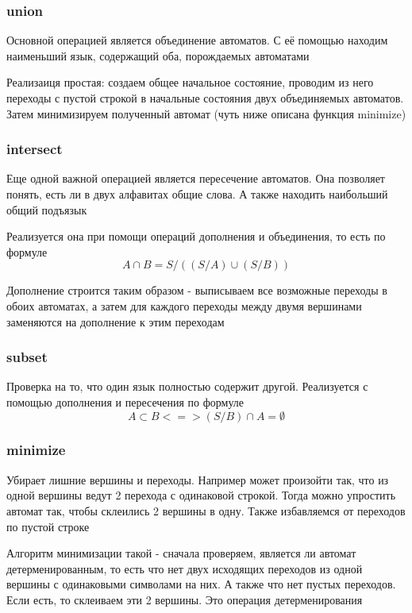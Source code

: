 \subsubsection*{union}
Основной операцией является объединение автоматов. С её помощью находим наименьший язык, содержащий оба, порождаемых автоматами

Реализаиця простая: создаем общее начальное состояние, проводим из него переходы с пустой строкой в начальные состояния двух объединяемых автоматов. Затем минимизируем полученный автомат (чуть ниже описана функция minimize)

\subsubsection*{intersect}
Еще одной важной операцией является пересечение автоматов. Она позволяет понять, есть ли в двух алфавитах общие слова. А также находить наибольший общий подъязык

Реализуется она при помощи операций дополнения и объединения, то есть по формуле \[A \cap B = S / ((S / A) \cup (S / B))\]

Дополнение строится таким образом - выписываем все возможные переходы в обоих автоматах, а затем для каждого переходы между двумя вершинами заменяются на дополнение к этим переходам

\subsubsection*{subset}
Проверка на то, что один язык полностью содержит другой. Реализуется с помощью дополнения и пересечения по формуле
\[A \subset B <=> (S / B) \cap A = \emptyset\]

\subsubsection*{minimize}
Убирает лишние вершины и переходы. Например может произойти так, что из одной вершины ведут 2 перехода с одинаковой строкой. Тогда можно упростить автомат так, чтобы склеились 2 вершины в одну. Также избавляемся от переходов по пустой строке

Алгоритм минимизации такой - сначала проверяем, является ли автомат детерменированным, то есть что нет двух исходящих переходов из одной вершины с одинаковыми символами на них. А также что нет пустых переходов. Если есть, то склеиваем эти 2 вершины. Это операция детерменирования

